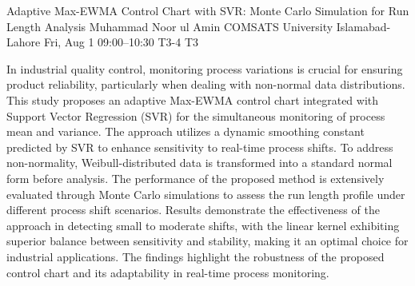 \begin{talk}
  {Adaptive Max-EWMA Control Chart with SVR: Monte Carlo Simulation for Run Length Analysis}%
  {Muhammad Noor ul Amin}%
  {COMSATS University Islamabad-Lahore}%
  {}%
  {}%
  {}%
  {Fri, Aug 1 09:00–10:30}%
  {T3-4}%
  {T3}%
  {}%
  {}%
  {}%
				
			
In industrial quality control, monitoring process variations is crucial for ensuring product
reliability, particularly when dealing with non-normal data distributions. This study proposes an
adaptive Max-EWMA control chart integrated with Support Vector Regression (SVR) for the
simultaneous monitoring of process mean and variance. The approach utilizes a dynamic
smoothing constant predicted by SVR to enhance sensitivity to real-time process shifts. To
address non-normality, Weibull-distributed data is transformed into a standard normal form
before analysis. The performance of the proposed method is extensively evaluated through
Monte Carlo simulations to assess the run length profile under different process shift scenarios.
Results demonstrate the effectiveness of the approach in detecting small to moderate shifts, with
the linear kernel exhibiting superior balance between sensitivity and stability, making it an
optimal choice for industrial applications. The findings highlight the robustness of the proposed
control chart and its adaptability in real-time process monitoring.
\medskip

\end{talk}

